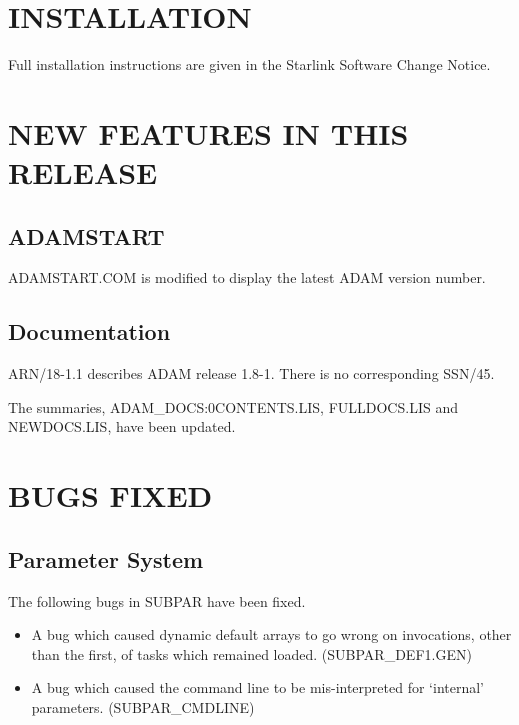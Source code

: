 \section{INSTALLATION}
Full installation instructions are given in the Starlink Software
Change Notice.

\section{NEW FEATURES IN THIS RELEASE}


\subsection{ADAMSTART}
ADAMSTART.COM is modified to display the latest ADAM version number.

\subsection{Documentation}
ARN/18-1.1 describes ADAM release 1.8-1.
There is no corresponding SSN/45.

The summaries, ADAM\_DOCS:0CONTENTS.LIS, FULLDOCS.LIS and NEWDOCS.LIS, have
been updated.

\section{BUGS FIXED}

\subsection{Parameter System}
The following bugs in SUBPAR have been fixed.
\begin{itemize}
\item A bug which caused dynamic default arrays to go wrong on invocations,
other than the first, of tasks which remained loaded.
(SUB\-PAR\_\-DEF1\-.GEN)
\item A bug which caused the command line to be mis-interpreted for `internal'
parameters.
(SUB\-PAR\_\-CMD\-LINE)
\end{itemize}


